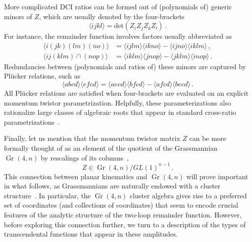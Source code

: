 \documentclass[11pt]{article}
\DeclareMathOperator{\Gr}{Gr}
\def\ket#1{\langle #1 \rangle}
\begin{document}
More complicated DCI ratios can be formed out of (polynomials of) generic minors of $Z$, which are usually denoted by the four-brackets
\begin{equation} \label{eq:four_bracket_def}
\langle i j k l \rangle = \text{det}(Z_i Z_j Z_k Z_l) \, .
\end{equation}
For instance, the remainder function involves factors usually abbreviated as 
\begin{align}
\langle i (j k)( l m) (n o)\rangle &= 
\langle i j l m \rangle \langle i k n o \rangle - \langle i j n o\rangle \langle i k l m \rangle \, , \label{eq:abbrev_1} \\
\langle i j (k l m) \cap (n o p) \rangle &= 
 \langle i k l m \rangle \langle j n o p \rangle - \langle j k l m \rangle \langle i n o p \rangle \, . \label{eq:abbrev_2}
\end{align} 
Redundancies between (polynomials and ratios of) these minors are captured by Pl\"ucker relations, such as
\begin{equation}
  \label{eq:plucker-rel}
  \ket{abcd} \ket{efcd} = \ket{aecd} \ket{bfcd} - \ket{afcd}\ket{becd} \, .
\end{equation}
All Pl\"ucker relations are satisfied when four-brackets are evaluated on an explicit momentum twistor parametrization. Helpfully, these parameterizations also rationalize large classes of algebraic roots that appear in standard cross-ratio parametrizations~\cite{Bourjaily:2018aeq}. 


Finally, let us mention that the momentum twistor matrix $Z$ can be more formally thought of as an element of the quotient of the Grassmannian $\Gr(4,n)$ by rescalings of its columns~\cite{ArkaniHamed:2012nw},
\begin{equation}
Z \in \Gr(4,n)/GL(1)^{n-1} \, .
\end{equation}
This connection between planar kinematics and $\Gr(4,n)$ will prove important in what follows, as Grassmannians are naturally endowed with a cluster structure~\cite{Golden:2013xva}. In particular, the $\Gr(4,n)$ cluster algebra gives rise to a preferred set of  coordinates (and collections of coordinates) that seem to encode crucial features of the analytic structure of the two-loop remainder function. However, before exploring this connection further, we turn to a description of the types of transcendental functions that appear in these amplitudes.
\end{document}
